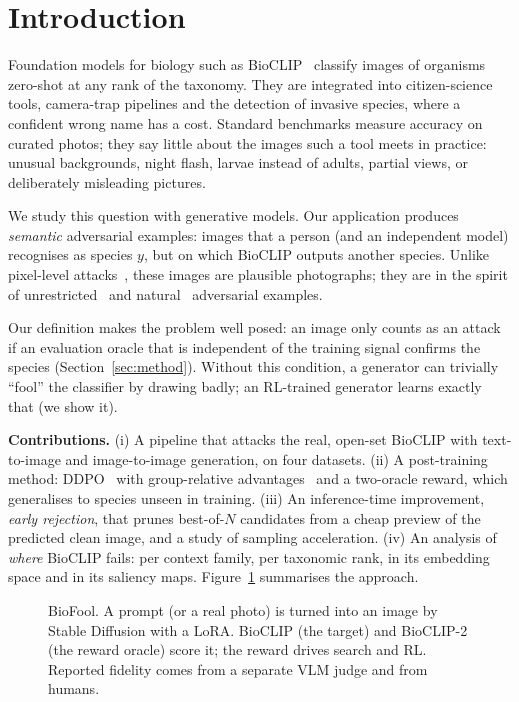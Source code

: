 \section{Introduction}
Foundation models for biology such as BioCLIP~\citep{stevens2024bioclip} classify images of organisms zero-shot at
any rank of the taxonomy. They are integrated into citizen-science tools, camera-trap pipelines and the detection of
invasive species, where a confident wrong name has a cost. Standard benchmarks measure accuracy on curated photos;
they say little about the images such a tool meets in practice: unusual backgrounds, night flash, larvae instead of
adults, partial views, or deliberately misleading pictures.

We study this question with generative models. Our application produces \emph{semantic} adversarial examples: images
that a person (and an independent model) recognises as species $y$, but on which BioCLIP outputs another species.
Unlike pixel-level attacks~\citep{szegedy2014intriguing}, these images are plausible photographs; they are in the
spirit of unrestricted~\citep{song2018constructing} and natural~\citep{hendrycks2021natural} adversarial examples.

Our definition makes the problem well posed: an image only counts as an attack if an evaluation oracle that is
independent of the training signal confirms the species (Section~\ref{sec:method}). Without this condition, a generator
can trivially ``fool'' the classifier by drawing badly; an RL-trained generator learns exactly that (we show it).

\textbf{Contributions.}
(i) A pipeline that attacks the real, open-set BioCLIP with text-to-image and image-to-image generation, on four
datasets.
(ii) A post-training method: DDPO~\citep{black2024ddpo} with group-relative advantages~\citep{shao2024deepseekmath}
and a two-oracle reward, which generalises to species unseen in training.
(iii) An inference-time improvement, \emph{early rejection}, that prunes best-of-$N$ candidates from a cheap preview
of the predicted clean image, and a study of sampling acceleration.
(iv) An analysis of \emph{where} BioCLIP fails: per context family, per taxonomic rank, in its embedding space and in
its saliency maps. Figure~\ref{fig:pipeline} summarises the approach.

\begin{figure}[t]
\centering
\resizebox{\columnwidth}{!}{}
\caption{BioFool. A prompt (or a real photo) is turned into an image by Stable Diffusion with a LoRA. BioCLIP (the
target) and BioCLIP-2 (the reward oracle) score it; the reward drives search and RL. Reported fidelity comes from a
separate VLM judge and from humans.}
\label{fig:pipeline}
\end{figure}
